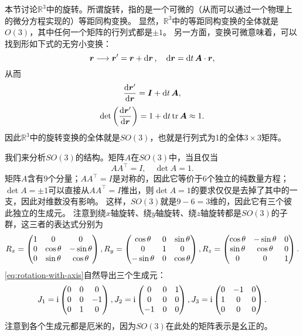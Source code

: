 \documentclass[hyperref, UTF8, a4paper]{ctexart}
\newcommand*{\ii}{\mathrm{i}}
\newcommand*{\reals}{\mathbb{R}}
\begin{document}
本节讨论$\reals^3$中的旋转。所谓旋转，指的是一个可微的（从而可以通过一个物理上的微分方程实现的）等距同构变换。
显然，$\reals^3$中的等距同构变换的全体就是$O(3)$，其中任何一个矩阵的行列式都是$\pm 1$。
另一方面，变换可微意味着，可以找到形如下式的无穷小变换：
\[
    \vb*{r} \longrightarrow \vb*{r}' = \vb*{r} + \dd{\vb*{r}}, \quad \dd{\vb*{r}} = \dd{t} \vb*{A} \cdot \vb*{r},
\]
从而
\[
    \dv{\vb*{r}'}{\vb*{r}} = \vb*{I} + \dd{t} \vb*{A},
\]
\[
    \det \left( \dv{\vb*{r}'}{\vb*{r}} \right) = 1 + \dd{t} \trace \vb*{A} \approx 1.
\]
因此$\reals^3$中的旋转变换的全体就是$SO(3)$，也就是行列式为1的全体$3\times 3$矩阵。

我们来分析$SO(3)$的结构。矩阵$A$在$SO(3)$中，当且仅当
\begin{equation}
    A A^\top = I, \quad \det A = 1.
    \label{eq:def-so3}
\end{equation}
矩阵$A$含有9个分量；$A A^\top = I$是对称的，因此它等价于6个独立的纯数量方程；
$\det A = \pm 1$可以直接从$A A^\top=I$推出，则$\det A = 1$的要求仅仅是去掉了其中的一支，因此对维数没有影响。
这样，$SO(3)$就是$9-6=3$维的，因此它有三个彼此独立的生成元。
注意到绕$x$轴旋转、绕$y$轴旋转、绕$z$轴旋转都是$SO(3)$的子群，这三者的表达式分别为
\begin{equation}
    R_x = \pmqty{1 & 0 & 0 \\ 0 & \cos \theta & -\sin \theta \\ 0 & \sin \theta & \cos \theta}, 
    R_y = \pmqty{\cos \theta & 0 & \sin \theta \\ 0 & 1 & 0 \\ - \sin \theta & 0 & \cos \theta}, 
    R_z = \pmqty{\cos \theta & - \sin \theta & 0 \\ \sin \theta & \cos \theta & 0 \\ 0 & 0 & 1}.
    \label{eq:rotation-with-axis}
\end{equation}
\eqref{eq:rotation-with-axis}自然导出三个生成元：
\begin{equation}
    J_1 = \ii \pmqty{0 & 0 & 0 \\ 0 & 0 & -1 \\ 0 & 1 & 0}, 
    J_2 = \ii \pmqty{0 & 0 & 1 \\ 0 & 0 & 0 \\ -1 & 0 & 0}, \\
    J_3 = \ii \pmqty{0 & -1 & 0 \\ 1 & 0 & 0 \\ 0 & 0 & 0}.
    \label{eq:generators-of-so3}
\end{equation}
注意到各个生成元都是厄米的，因为$SO(3)$在此处的矩阵表示是幺正的。
\end{document}
